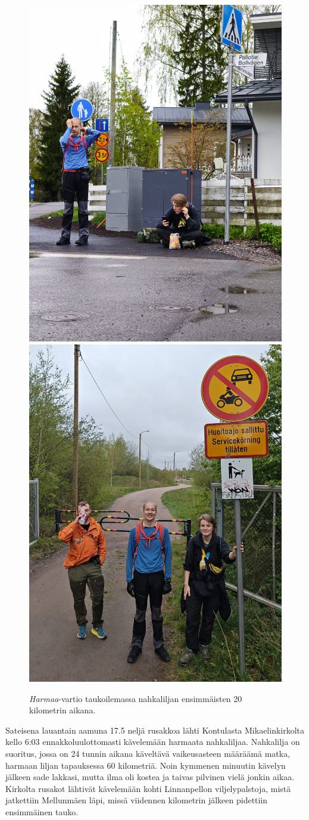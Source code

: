 \begin{multicols}{2}
\begin{figure}[!t]
\centering\includegraphics[width=.475\textwidth]{assets/nahkaliljaHarmaa1}\hfill\includegraphics[width=.475\textwidth]{assets/nahkaliljaHarmaa2}
\caption{\textit{Harmaa}-vartio taukoilemassa nahkaliljan ensimmäisten 20 kilometrin aikana.}
\end{figure}

\noindent Sateisena lauantain aamuna 17.5 neljä rusakkoa lähti Kontulasta Mikaelinkirkolta kello 6:03 ennakkoluulottomasti kävelemään harmaata nahkaliljaa. Nahkalilja on suoritus, jossa on 24 tunnin aikana käveltävä vaikeusasteen määräämä matka, harmaan liljan tapauksessa 60 kilometriä. Noin kymmenen minuutin kävelyn jälkeen sade lakkasi, mutta ilma oli kostea ja taivas pilvinen vielä jonkin aikaa. Kirkolta rusakot lähtivät kävelemään kohti Linnanpellon viljelypalstoja, mistä jatkettiin Mellunmäen läpi, missä viidennen kilometrin jälkeen pidettiin ensimmäinen tauko.


\end{multicols}
